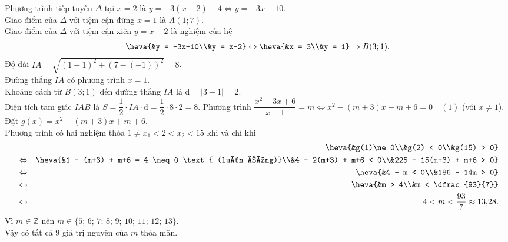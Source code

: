 \begin{ex}
{\begin{itemchoice}
			Phương trình tiếp tuyến $\Delta$ tại $x=2$ là $y = -3(x-2)+4 \Leftrightarrow y = -3x+10$.\\
			Giao điểm của $\Delta$ với tiệm cận đứng $x=1$ là $A(1;7)$.\\
			Giao điểm của $\Delta$ với tiệm cận xiên $y=x-2$ là nghiệm của hệ \[\heva{&y = -3x+10\\&y = x-2} \Leftrightarrow \heva{&x = 3\\&y = 1} \Rightarrow B(3;1).\]
			Độ dài $IA = \sqrt{(1-1)^2 + (7 - (-1))^2} = 8$.\\
			Đường thẳng $IA$ có phương trình $x=1$.\\
			Khoảng cách từ $B(3;1)$ đến đường thẳng $IA$ là $\mathrm{d} = |3-1| = 2$.\\
			Diện tích tam giác $IAB$ là $S = \dfrac{1}{2} \cdot IA \cdot \mathrm{d} = \dfrac{1}{2} \cdot 8 \cdot 2 = 8$.			
			\itemch Phương trình $\dfrac{x^2-3x+6}{x-1}=m \Leftrightarrow x^2 - (m+3)x + m+6 = 0 \quad (1)$ (với $x \neq 1$).\\
			Đặt $g(x) = x^2 - (m+3)x + m+6$.\\ 
			Phương trình có hai nghiệm thỏa $1\ne x_1<2<x_2<15$ khi và chỉ khi
			\allowdisplaybreaks
			\begin{eqnarray*}
				&&\heva{&g(1)\ne 0\\&g(2) < 0\\&g(15) > 0}\\
				&\Leftrightarrow& \heva{&1 - (m+3) + m+6 = 4 \neq 0 \text{ (luôn đúng)}\\&4 - 2(m+3) + m+6 < 0\\&225 - 15(m+3) + m+6 > 0}\\
				&\Leftrightarrow& \heva{&4 - m < 0\\&186 - 14m > 0}\\
				&\Leftrightarrow& \heva{&m > 4\\&m < \dfrac{93}{7}}\\
				&\Leftrightarrow& 4 < m < \dfrac{93}{7} \approx 13{,}28.
			\end{eqnarray*}
			Vì $m \in \mathbb{Z}$ nên $m \in \{5;\, 6;\, 7;\, 8;\, 9;\, 10;\, 11;\, 12;\, 13\}$.\\
			Vậy có tất cả $9$ giá trị nguyên của $m$ thỏa mãn.
		\end{itemchoice}
	}
\end{ex}

